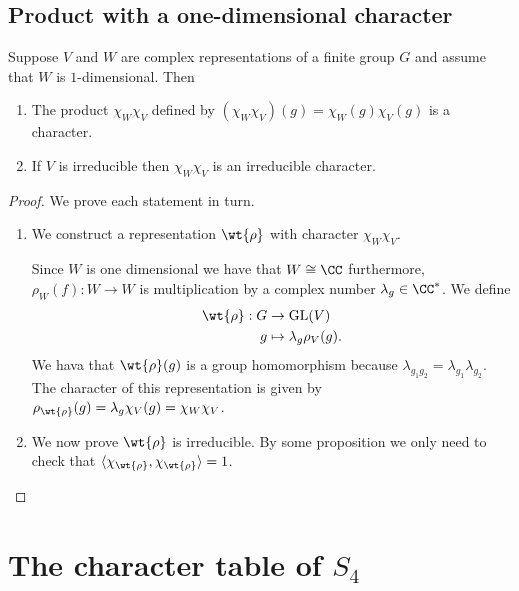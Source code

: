 \documentclass[12pt, a4paper]{article}
\newcommand{\gl}{\text{GL}}
\begin{document}
\subsection{Product with a one-dimensional character}

\begin{mdlemma}
    Suppose \(V\) and \(W\) are complex representations of a finite group \(G\) and assume that \(W\) is \(1\)-dimensional. Then 
    \begin{enumerate}
        \item The product \(\chi_W\chi_V\) defined by \((\chi_W\chi_V)(g)=\chi_W(g)\chi_V(g)\) is a character.
        \item If \(V\) is irreducible then \(\chi_W\chi_V\) is an irreducible character.
    \end{enumerate}
\end{mdlemma}

\begin{proof}
    We prove each statement in turn.
    \begin{enumerate}
        \item We construct a representation \(\wt{\rho}\) with character \(\chi_W\chi_V\). 

        Since \(W\) is one dimensional we have that \(W \cong \CC\) furthermore, \(\rho_W(f) : W \to W\) is multiplication by a complex number \(\lambda_g \in \CC^*\). We define 
        \[\begin{aligned}
            \wt{\rho} : G &\to \gl(V) \\
            g &\mapsto \lambda_g \rho_V(g).
        \end{aligned}\]
        We hava that \(\wt{\rho}(g)\) is a group homomorphism because \(\lambda_{g_1g_2}=\lambda_{g_1}\lambda_{g_2}\). The character of this representation is given by \(\rho_{\wt{\rho}}(g)=\lambda_g \chi_V(g)= \chi_W\chi_V\). 
        \item We now prove \(\wt{\rho}\) is irreducible. By some proposition we only need to check that \(\langle \chi_{\wt{\rho}},\chi_{\wt{\rho}} \rangle=1\).
    \end{enumerate}
\end{proof}

\section{The character table of \texorpdfstring{\(S_4\)}{TEXT}}
\end{document}
